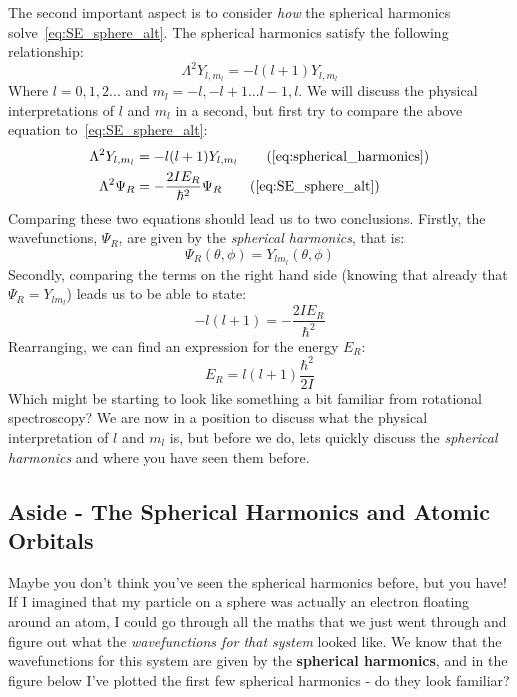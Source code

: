\documentclass{memoir}[11pt,oneside,a4paper,openany]
\newcommand{\wf}{\ensuremath{\Psi}\xspace}
\begin{document}
The second important aspect is to consider \emph{how} the spherical harmonics solve~\autoref{eq:SE_sphere_alt}. The spherical harmonics satisfy the following relationship:
\begin{equation}\label{eq:spherical_harmonics}
	\Lambda^2Y_{l,m_l} = -l(l+1)Y_{l,m_l}
\end{equation}
Where $l = 0,1,2...$ and $m_l = -l, -l+1...l-1,l$. We will discuss the physical interpretations of $l$ and $m_l$ in a second, but first try to compare the above equation to~\autoref{eq:SE_sphere_alt}:
\begin{align*}
	\Lambda^2Y_{l,m_l} &= -l(l+1)Y_{l,m_l} \tag{\ref{eq:spherical_harmonics}}\\
	\Lambda^2\wf_{R} &= -\frac{2IE_R}{\hbar^2}\wf_R \tag{\ref{eq:SE_sphere_alt}}
\end{align*}
Comparing these two equations should lead us to two conclusions. Firstly, the wavefunctions, $\wf_R$, are given by the \emph{spherical harmonics}, that is:
\begin{equation}
	\wf_R(\theta,\phi) = Y_{lm_l}(\theta,\phi)
\end{equation}
Secondly, comparing the terms on the right hand side (knowing that already that $\wf_R = Y_{lm_l}$) leads us to be able to state:
\begin{equation}
	-l(l+1) = -\frac{2IE_R}{\hbar^2}
\end{equation}
Rearranging, we can find an expression for the energy $E_R$:
\begin{equation}
	E_R = l(l+1)\frac{\hbar^2}{2I}
\end{equation}
Which might be starting to look like something a bit familiar from rotational spectroscopy? We are now in a position to discuss what the physical interpretation of $l$ and $m_l$ is, but before we do, lets quickly discuss the \emph{spherical harmonics} and where you have seen them before. 

\subsection{Aside - The Spherical Harmonics and Atomic Orbitals}
Maybe you don't think you've seen the spherical harmonics before, but you have! If I imagined that my particle on a sphere was actually an electron floating around an atom, I could go through all the maths that we just went through and figure out what the \emph{wavefunctions for that system} looked like. We know that the wavefunctions for this system are given by the \textbf{spherical harmonics}, and in the figure below I've plotted the first few spherical harmonics - do they look familiar?
\end{document}
